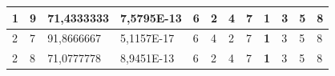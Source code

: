 \documentclass[conference]{IEEEtran}
\begin{document}
\begin{table}[]
\begin{tabular}{|llll|llllllll|}
\multicolumn{1}{|l|}{1}                                                     & \multicolumn{1}{l|}{9}                                                        & \multicolumn{1}{l|}{71,4333333}                                                   & 7,5795E-13                     & \multicolumn{1}{l|}{6}                                                  & \multicolumn{1}{l|}{2}                                                  & \multicolumn{1}{l|}{4}                                                  & \multicolumn{1}{l|}{7}                                                  & \multicolumn{1}{l|}{\textbf{1}}                                         & \multicolumn{1}{l|}{3}                                                  & \multicolumn{1}{l|}{5}                                                  & 8                          \\ \hline
\multicolumn{1}{|l|}{2}                                                     & \multicolumn{1}{l|}{7}                                                        & \multicolumn{1}{l|}{91,8666667}                                                   & 5,1157E-17                     & \multicolumn{1}{l|}{6}                                                  & \multicolumn{1}{l|}{4}                                                  & \multicolumn{1}{l|}{2}                                                  & \multicolumn{1}{l|}{7}                                                  & \multicolumn{1}{l|}{\textbf{1}}                                         & \multicolumn{1}{l|}{3}                                                  & \multicolumn{1}{l|}{5}                                                  & 8                          \\ \hline
\multicolumn{1}{|l|}{2}                                                     & \multicolumn{1}{l|}{8}                                                        & \multicolumn{1}{l|}{71,0777778}                                                   & 8,9451E-13                     & \multicolumn{1}{l|}{6}                                                  & \multicolumn{1}{l|}{2}                                                  & \multicolumn{1}{l|}{4}                                                  & \multicolumn{1}{l|}{7}                                                  & \multicolumn{1}{l|}{\textbf{1}}                                         & \multicolumn{1}{l|}{3}                                                  & \multicolumn{1}{l|}{5}                                                  & 8                          \\ \hline

\end{tabular}
\end{table}
\end{document}
